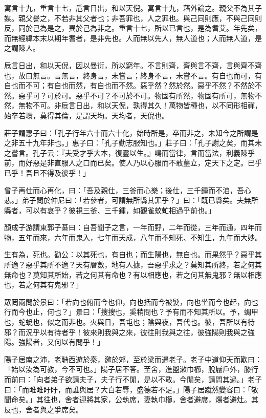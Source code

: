 
\begin{pinyinscope}
寓言十九，重言十七，卮言日出，和以天倪。寓言十九，藉外論之。親父不為其子媒。親父譽之，不若非其父者也；非吾罪也，人之罪也。與己同則應，不與己同則反，同於己為是之，異於己為非之。重言十七，所以已言也，是為耆艾。年先矣，而無經緯本末以期年耆者，是非先也。人而無以先人，無人道也；人而無人道，是之謂陳人。

卮言日出，和以天倪，因以曼衍，所以窮年。不言則齊，齊與言不齊，言與齊不齊也，故曰無言。言無言，終身言，未嘗言；終身不言，未嘗不言。有自也而可，有自也而不可；有自也而然，有自也而不然。惡乎然？然於然。惡乎不然？不然於不然。惡乎可？可於可。惡乎不可？不可於不可。物固有所然，物固有所可，無物不然，無物不可。非卮言日出，和以天倪，孰得其久！萬物皆種也，以不同形相禪，始卒若環，莫得其倫，是謂天均。天均者，天倪也。

莊子謂惠子曰：「孔子行年六十而六十化，始時所是，卒而非之，未知今之所謂是之非五十九年非也。」惠子曰：「孔子勤志服知也。」莊子曰：「孔子謝之矣，而其未之嘗言。孔子云：『夫受才乎大本，復靈以生。』鳴而當律，言而當法，利義陳乎前，而好惡是非直服人之口而已矣。使人乃以心服而不敢蘁立，定天下之定。已乎已乎！吾且不得及彼乎！」

曾子再仕而心再化，曰：「吾及親仕，三釜而心樂；後仕，三千鍾而不洎，吾心悲。」弟子問於仲尼曰：「若參者，可謂無所縣其罪乎？」曰：「既已縣矣。夫無所縣者，可以有哀乎？彼視三釜、三千鍾，如觀雀蚊虻相過乎前也。」

顏成子游謂東郭子綦曰：自吾聞子之言，一年而野，二年而從，三年而通，四年而物，五年而來，六年而鬼入，七年而天成，八年而不知死、不知生，九年而大妙。

生有為，死也。勸公：以其死也，有自也；而生陽也，無自也。而果然乎？惡乎其所適？惡乎其所不適？天有曆數，地有人據，吾惡乎求之？莫知其所終，若之何其無命也？莫知其所始，若之何其有命也？有以相應也，若之何其無鬼邪？無以相應也，若之何其有鬼邪？」

眾罔兩問於景曰：「若向也俯而今也仰，向也括而今被髮，向也坐而今也起，向也行而今也止，何也？」景曰：「搜搜也，奚稍問也？予有而不知其所以。予，蜩甲也，蛇蛻也，似之而非也。火與日，吾屯也；陰與夜，吾代也。彼，吾所以有待邪？而況乎以有待者乎！彼來則我與之來，彼往則我與之往，彼強陽則我與之強陽。強陽者，又何以有問乎！」

陽子居南之沛，老聃西遊於秦，邀於郊，至於梁而遇老子。老子中道仰天而歎曰：「始以汝為可教，今不可也。」陽子居不答。至舍，進盥漱巾櫛，脫屨戶外，膝行而前曰：「向者弟子欲請夫子，夫子行不閒，是以不敢。今閒矣，請問其過。」老子曰：「而睢睢盱盱，而誰與居？大白若辱，盛德若不足。」陽子居蹴然變容曰：「敬聞命矣。」其往也，舍者迎將其家，公執席，妻執巾櫛，舍者避席，煬者避灶。其反也，舍者與之爭席矣。


\end{pinyinscope}